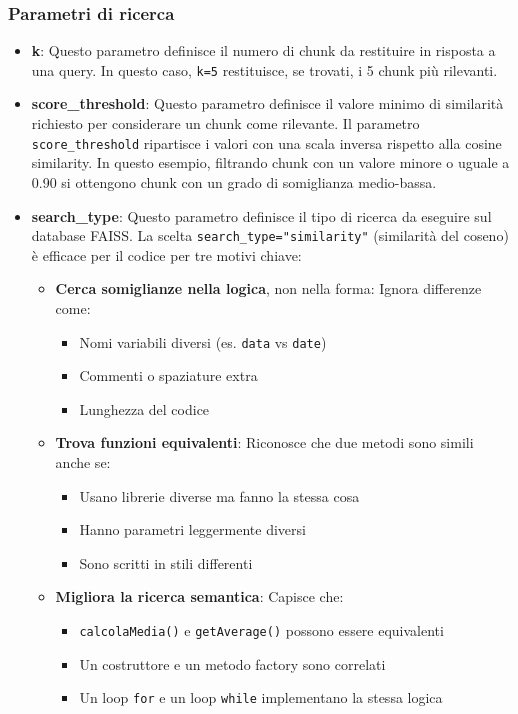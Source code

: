 \documentclass[12pt,a4paper,openright,twoside]{book}
\begin{document}
\subsubsection{Parametri di ricerca}
\begin{itemize}
    \item \textbf{k}: Questo parametro definisce il numero di chunk da restituire in risposta a una query. In questo caso, \texttt{k=5} restituisce, se trovati, i 5 chunk più rilevanti.
    \item \textbf{score\_threshold}: Questo parametro definisce il valore minimo di similarità richiesto per considerare un chunk come rilevante. Il parametro \texttt{score\_threshold} ripartisce i valori con una scala inversa rispetto alla cosine similarity. In questo esempio, filtrando chunk con un valore minore o uguale a 0.90 si ottengono chunk con un grado di somiglianza medio-bassa.
    \item \textbf{search\_type}: Questo parametro definisce il tipo di ricerca da eseguire sul database FAISS. La scelta \texttt{search\_type="similarity"} (similarità del coseno) è efficace per il codice per tre motivi chiave:
    \begin{itemize}
        \item \textbf{Cerca somiglianze nella logica}, non nella forma: Ignora differenze come:
        \begin{itemize}
            \item Nomi variabili diversi (es. \texttt{data} vs \texttt{date})
            \item Commenti o spaziature extra
            \item Lunghezza del codice
        \end{itemize}
        \item \textbf{Trova funzioni equivalenti}: Riconosce che due metodi sono simili anche se:
        \begin{itemize}
            \item Usano librerie diverse ma fanno la stessa cosa
            \item Hanno parametri leggermente diversi
            \item Sono scritti in stili differenti
        \end{itemize}
        \item \textbf{Migliora la ricerca semantica}: Capisce che:
        \begin{itemize}
            \item \texttt{calcolaMedia()} e \texttt{getAverage()} possono essere equivalenti
            \item Un costruttore e un metodo factory sono correlati
            \item Un loop \texttt{for} e un loop \texttt{while} implementano la stessa logica
        \end{itemize}
    \end{itemize}
\end{itemize}
\end{document}
